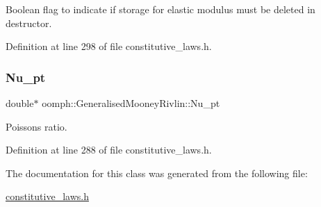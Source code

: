 Boolean flag to indicate if storage for elastic modulus must be deleted in destructor. 



Definition at line 298 of file constitutive\+\_\+laws.\+h.

\mbox{\label{classoomph_1_1GeneralisedMooneyRivlin_ae66d1130fccc98fc68d810f1f3e6b281}} 
\subsubsection{\texorpdfstring{Nu\+\_\+pt}{Nu\_pt}}
{\footnotesize\ttfamily double$\ast$ oomph\+::\+Generalised\+Mooney\+Rivlin\+::\+Nu\+\_\+pt\hspace{0.3cm}{\ttfamily [private]}}



Poisson\textquotesingle{}s ratio. 



Definition at line 288 of file constitutive\+\_\+laws.\+h.



The documentation for this class was generated from the following file\+:\begin{DoxyCompactItemize}
\item 
\hyperlink{constitutive__laws_8h}{constitutive\+\_\+laws.\+h}\end{DoxyCompactItemize}
